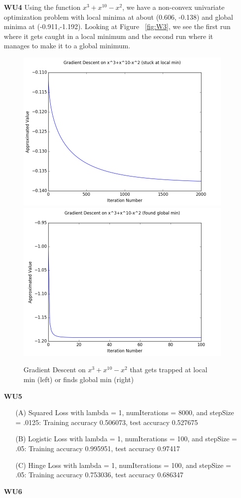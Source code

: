\documentclass{article}
\begin{document}
\begin{enumerate}
	\item[\textbf{WU4}] 
Using the function $x^3+x^{10}-x^2$, we have a non-convex univariate optimization problem with local minima at about (0.606, -0.138) and global minima at (-0.911,-1.192). Looking at Figure ~\ref{fig:W3}, we see the first run where it gets caught in a local minimum and the second run  where it manages to make it to a global minimum.

\begin{figure}[htp]
\centering
\includegraphics[width=.5\textwidth]{gd_local_min.png}\hfill
\includegraphics[width=.5\textwidth]{gd_global_min.png}
\caption{Gradient Descent on $x^3+x^{10}-x^2$ that gets trapped at local min (left) or finds global min (right)}
\label{fig:WU3}
\end{figure}

	\item[\textbf{WU5}] 
	
	\begin{enumerate}
		\item[(A)] Squared Loss with lambda = 1, numIterations = 8000, and stepSize = .0125: Training accuracy 0.506073, test accuracy 0.527675
		\item[(B)] Logistic Loss with lambda = 1, numIterations = 100, and stepSize = .05: Training accuracy 0.995951, test accuracy 0.97417
		\item[(C)] Hinge Loss with lambda = 1, numIterations = 100, and stepSize = .05: Training accuracy 0.753036, test accuracy 0.686347
		
	\end{enumerate}
	
		
	\item[\textbf{WU6}]
	
	\end{enumerate}
\end{document}
